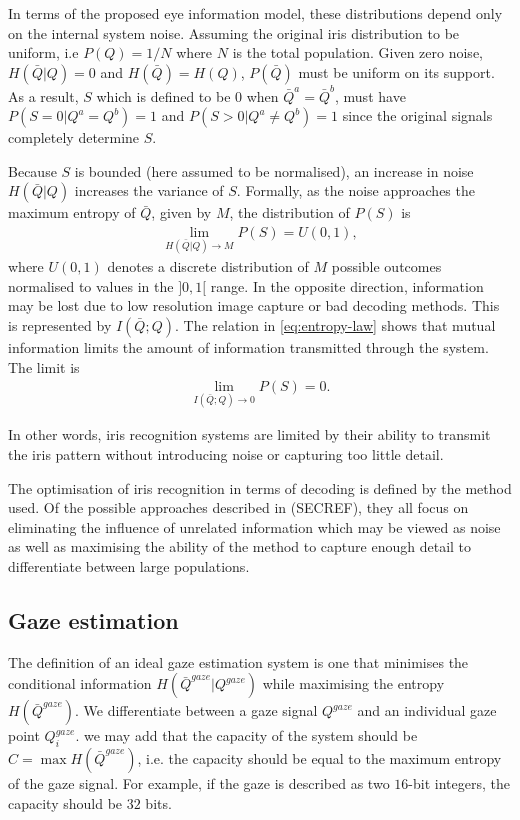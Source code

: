 In terms of the proposed eye information model, these distributions depend only on the internal system noise. Assuming the original iris distribution to be uniform, i.e $P(Q)=1/N$ where $N$ is the total population. Given zero noise, $H(\bar{Q}|Q)=0$ and $H(\bar{Q})=H(Q)$, $P(\bar{Q})$ must be uniform on its support. As a result, $S$ which is defined to be $0$ when $\bar{Q}^a = \bar{Q}^b$, must have $P(S=0|Q^a = Q^b)=1$ and $P(S>0|Q^a \neq Q^b)=1$ since the original signals completely determine $S$. 

Because $S$ is bounded (here assumed to be normalised), an increase in noise $H(\bar{Q}|Q)$ increases the variance of $S$. Formally, as the noise approaches the maximum entropy of $\bar{Q}$, given by $M$, the distribution of $P(S)$ is
\begin{align}
\lim_{H(\bar{Q}|Q)\rightarrow M} P(S) = U(0, 1),
\end{align}
where $U(0, 1)$ denotes a discrete distribution of $M$ possible outcomes normalised to values in the $]0, 1[$ range. In the opposite direction, information may be lost due to low resolution image capture or bad decoding methods. This is represented by $I(\bar{Q};Q)$. The relation in \autoref{eq:entropy-law} shows that mutual information limits the amount of information transmitted through the system. The limit is
\begin{align}
\lim_{I(\bar{Q};Q)\rightarrow 0} P(S) = 0.
\end{align}

In other words, iris recognition systems are limited by their ability to transmit the iris pattern without introducing noise or capturing too little detail.

The optimisation of iris recognition in terms of decoding is defined by the method used. Of the possible approaches described in (SECREF), they all focus on eliminating the influence of unrelated information which may be viewed as noise as well as maximising the ability of the method to capture enough detail to differentiate between large populations. 

\subsection{Gaze estimation}\label{sec:gaze-goal}


The definition of an ideal gaze estimation system is one that minimises the conditional information $H(\bar{Q}^{gaze}|Q^{gaze})$ while maximising the entropy $H(\bar{Q}^{gaze})$. We differentiate between a gaze signal $Q^{gaze}$ and an individual gaze point $Q^{gaze}_i$. we may add that the capacity of the system should be $C = \max H(\bar{Q}^{gaze})$, i.e. the capacity should be equal to the maximum entropy of the gaze signal. For example, if the gaze is described as two $16$-bit integers, the capacity should be $32$ bits. 
 

